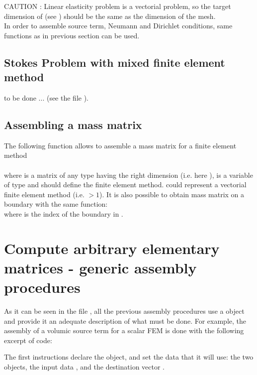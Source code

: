 \documentclass[11pt,a4paper]{article}
\begin{document}
CAUTION : Linear elasticity problem is a vectorial problem, so the target dimension of  (see ) should be the same as the dimension of the mesh.\\[0.5cm]

In order to assemble source term, Neumann and Dirichlet conditions, same functions as in previous section can be used.

\subsection{Stokes Problem with mixed finite element method}

to be done ... (see the file ).
 
\subsection{Assembling a mass matrix}

The following function allows to assemble a mass matrix for a finite element method\\[0.5cm]
 \\[0.5cm]
where  is a matrix of any type having the right dimension (i.e. here ),  is a variable of type  and should define the finite element method.  could represent a vectorial finite element method (i.e.  $> 1$).
It is also possible to obtain  mass matrix on a boundary with the same function:
 \\[0.5cm]
where  is the index of the boundary in .


\section{Compute arbitrary elementary matrices - generic assembly procedures}
As it can be seen in the file , all the
previous assembly procedures use a  object and
provide it an adequate description of what must be done. For example, 
the assembly of a volumic source term for a scalar FEM is done with the following excerpt of code:
The first instructions declare the object, and set the data that it will use: the two  objects, the input data , and the destination vector .
\end{document}
